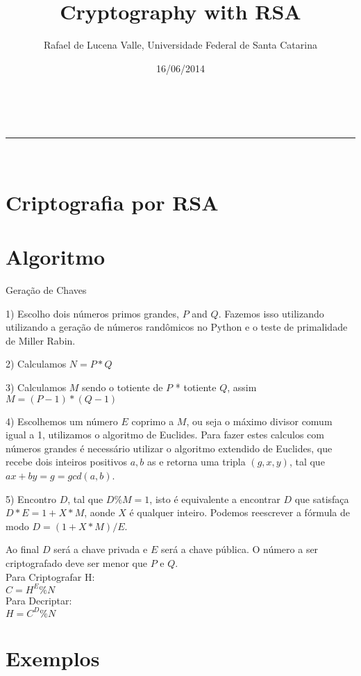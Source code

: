 \documentclass[a4paper,11pt]{article}
\makeatletter
\newcommand{\linia}{\rule{\linewidth}{0.5pt}}
\theoremstyle{mytheor}
\renewcommand{\maketitle}{
\begin{center}
\vspace{2ex}
{\huge \textsc{\@title}}
\vspace{1ex}
\\
\linia\\
\@author \hfill \@date
\vspace{4ex}
\end{center}
}
\makeatother
\begin{document}
\title{Cryptography with RSA}

\author{Rafael de Lucena Valle, Universidade Federal de Santa Catarina}

\date{16/06/2014}

\maketitle

\section*{Criptografia por RSA}

\section*{Algoritmo}

Geração de Chaves

1) Escolho dois números primos grandes, $P$ and $Q$.
Fazemos isso utilizando utilizando a geração de números randômicos no Python e o teste de primalidade de Miller Rabin.

2) Calculamos $N = P*Q$

3) Calculamos $M$ sendo o totiente de $P$ * totiente $Q$, assim $M = (P - 1)*(Q - 1)$

4) Escolhemos um número $E$ coprimo a $M$, ou seja o máximo divisor comum igual a 1, utilizamos o algoritmo de Euclides. Para fazer estes calculos com números grandes é necessário utilizar o algoritmo extendido de Euclides, que recebe dois inteiros positivos $a, b$ as e retorna uma tripla $(g, x, y)$, tal que $ax + by = g = gcd(a, b)$.

5) Encontro $D$, tal que $D \% M = 1$, isto é equivalente a encontrar $D$ que satisfaça $D*E = 1 + X*M$, aonde $X$ é qualquer inteiro. Podemos reescrever a fórmula de modo $D = (1 + X*M) / E$.

Ao final $D$ será a chave privada e $E$ será a chave pública. O número a ser criptografado deve ser menor que $P$ e $Q$.\\

Para Criptografar H:\\
$C = H^E \% N$\\

Para Decriptar:\\
$H = C^D \% N$

\section*{Exemplos}
\end{document}
